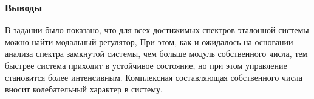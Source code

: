 \FloatBarrier
\subsubsection{Выводы}
В задании было показано, что для всех достижимых спектров эталонной системы можно найти модальный регулятор,
При этом, как и ожидалось на основании анализа спектра замкнутой системы, чем больше модуль
собственного числа, тем быстрее система приходит в устойчивое состояние, но при этом управление становится более интенсивным. 
Комплексная составляющая собственного числа вносит колебательный характер в систему. 